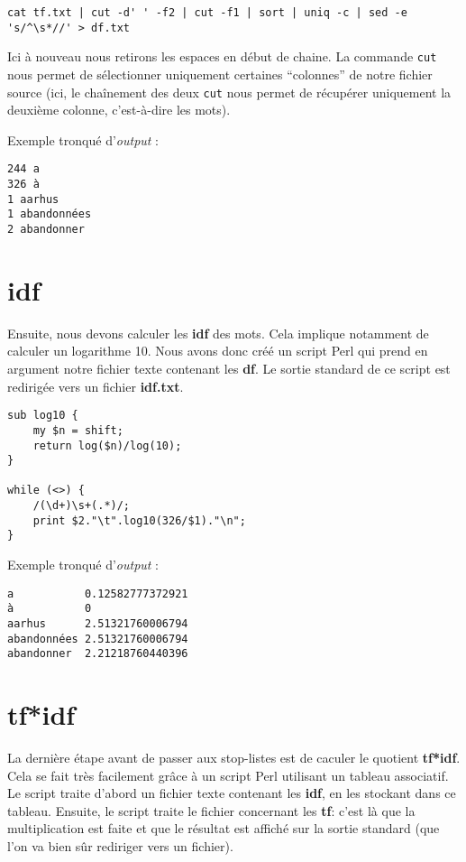\begin{lstlisting}
cat tf.txt | cut -d' ' -f2 | cut -f1 | sort | uniq -c | sed -e 's/^\s*//' > df.txt
\end{lstlisting}

Ici à nouveau nous retirons les espaces en début de chaine. La commande \lstinline{cut} nous permet de sélectionner uniquement certaines ``colonnes'' de notre fichier source (ici, le chaînement des deux \lstinline{cut} nous permet de récupérer uniquement la deuxième colonne, c'est-à-dire les mots).

\medskip
\noindent Exemple tronqué d'\textit{output} :
\begin{lstlisting}
244 a
326 à
1 aarhus
1 abandonnées
2 abandonner
\end{lstlisting}

\section{idf}

Ensuite, nous devons calculer les \textbf{idf} des mots. Cela implique notamment de calculer un logarithme 10. Nous avons donc créé un script Perl qui prend en argument notre fichier texte contenant les \textbf{df}. Le sortie standard de ce script est redirigée vers un fichier \textbf{idf.txt}.

\perl
\begin{lstlisting}
sub log10 {
    my $n = shift;
    return log($n)/log(10);
}

while (<>) {
    /(\d+)\s+(.*)/;
    print $2."\t".log10(326/$1)."\n";
}
\end{lstlisting}

\medskip

\noindent Exemple tronqué d'\textit{output} :
\begin{lstlisting}
a           0.12582777372921
à           0
aarhus      2.51321760006794
abandonnées 2.51321760006794
abandonner  2.21218760440396
\end{lstlisting}

\section{tf*idf}

La dernière étape avant de passer aux stop-listes est de caculer le quotient \textbf{tf*idf}. Cela se fait très facilement grâce à un script Perl utilisant un tableau associatif. Le script traite d'abord un fichier texte contenant les \textbf{idf}, en les stockant dans ce tableau. Ensuite, le script traite le fichier concernant les \textbf{tf}: c'est là que la multiplication est faite et que le résultat est affiché sur la sortie standard (que l'on va bien sûr rediriger vers un fichier).

